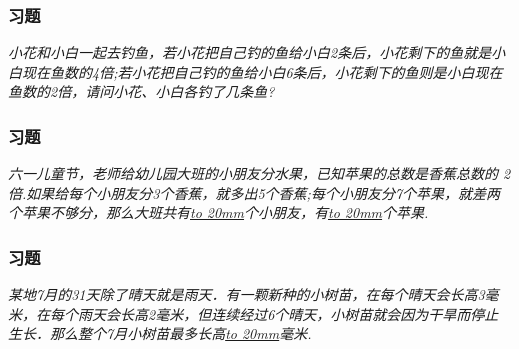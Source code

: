 \begin{frame}
    \frametitle{习题\theframecounter}
    \vspace*{-3cm}
    \textit{小花和小白一起去钓鱼，若小花把自己钓的鱼给小白2条后，小花剩下的鱼就是小白现在鱼数的4倍;若小花把自己钓的鱼给小白6条后，小花剩下的鱼则是小白现在鱼数的2倍，请问小花、小白各钓了几条鱼?} 
\end{frame}

\begin{frame}
    \frametitle{习题\theframecounter}
    \vspace*{-3cm}
    \textit{六一儿童节，老师给幼儿园大班的小朋友分水果，已知苹果的总数是香蕉总数的 2 倍.如果给每个小朋友分3个香蕉，就多出5个香蕉;每个小朋友分7个苹果，就差两个苹果不够分，那么大班共有\underline{\hbox to 20mm{}}个小朋友，有\underline{\hbox to 20mm{}}个苹果.} 
\end{frame}

\begin{frame}
    \frametitle{习题\theframecounter}
    \vspace*{-3cm}
    \textit{某地7月的31天除了晴天就是雨天．有一颗新种的小树苗，在每个晴天会长高3毫米，在每个雨天会长高2毫米，但连续经过6个晴天，小树苗就会因为干旱而停止生长．那么整个7月小树苗最多长高\underline{\hbox to 20mm{}}毫米.} 
\end{frame}
